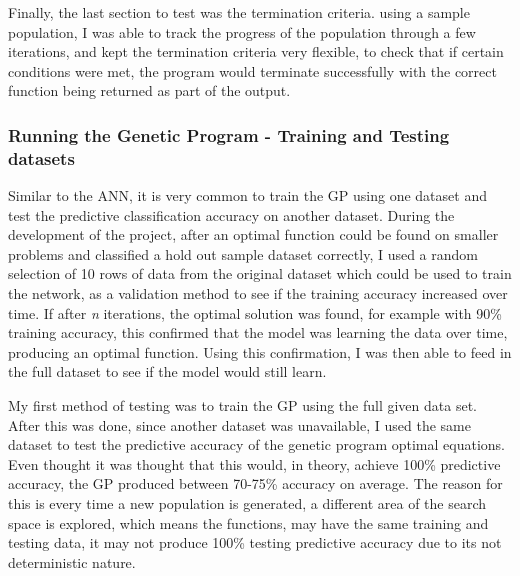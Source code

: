 \documentclass[11pt]{article}
\begin{document}
Finally, the last section to test was the termination criteria. using a sample population, I was able to track the progress of the population through a few iterations, and kept the termination criteria very flexible, to check that if certain conditions were met, the program would terminate successfully with the correct function being returned as part of the output. 
\subsubsection{Running the Genetic Program - Training and Testing datasets}\label{subsubsec:RGPTT}
Similar to the ANN, it is very common to train the GP using one dataset and test the predictive classification accuracy on another dataset. During the development of the project, after an optimal function could be found on smaller problems and classified a hold out sample dataset correctly, I used a random selection of 10 rows of data from the original dataset which could be used to train the network, as a validation method to see if the training accuracy increased over time. If after \textit{n} iterations, the optimal solution was found, for example with 90\% training accuracy, this confirmed that the model was learning the data over time, producing an optimal function. Using this confirmation, I was then able to feed in the full dataset to see if the model would still learn.

My first method of testing was to train the GP using the full given data set. After this was done, since another dataset was unavailable, I used the same dataset to test the predictive accuracy of the genetic program optimal equations. Even thought it was thought that this would, in theory, achieve 100\% predictive accuracy, the GP produced between 70-75\% accuracy on average. The reason for this is every time a new population is generated, a different area of the search space is explored, which means the functions, may have the same training and testing data, it may not produce 100\% testing predictive accuracy due to its not deterministic nature. 
\end{document}
